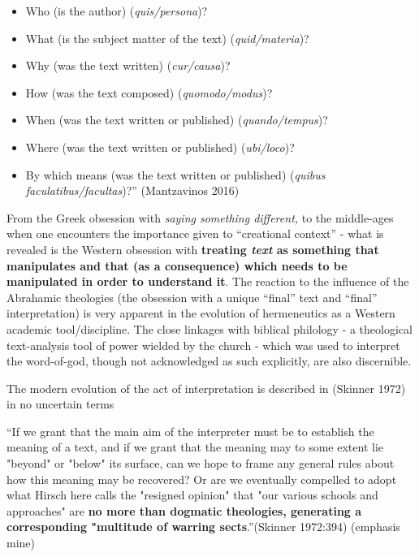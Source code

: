 \begin{itemize}
\itemsep=0pt
\item Who (is the author) (\textit{quis/persona})?

 \item What (is the subject matter of the text) (\textit{quid/materia})?

 \item Why (was the text written) (\textit{cur/causa})?

 \item How (was the text composed) (\textit{quomodo/modus})?

 \item When (was the text written or published) (\textit{quando/tempus})?

 \item Where (was the text written or published) (\textit{ubi/loco})?

 \item By which means (was the text written or published) (\textit{quibus faculatibus/facultas})?” (Mantzavinos 2016)

\end{itemize}

From the Greek obsession with \textit{saying something different,} to the middle-ages when one encounters the importance given to “creational context” - what is revealed is the Western obsession with \textbf{treating \textit{text} as something that manipulates and that (as a consequence) which needs to be manipulated in order to understand it}. The reaction to the influence of the Abrahamic theologies (the obsession with a unique “final” text and “final” interpretation) is very apparent in the evolution of hermeneutics as a Western academic tool/discipline. The close linkages with biblical philology - a theological text-analysis tool of power wielded by the church - which was used to interpret the word-of-god, though not acknowledged as such explicitly, are also discernible.

The modern evolution of the act of interpretation is described in (Skinner 1972) in no uncertain terms

\begin{myquote}
“If we grant that the main aim of the interpreter must be to establish the meaning of a text, and if we grant that the meaning may to some extent lie "beyond" or "below" its surface, can we hope to frame any general rules about how this meaning may be recovered? Or are we eventually compelled to adopt what Hirsch here calls the "resigned opinion" that "our various schools and approaches" are \textbf{no more than dogmatic theologies, generating a corresponding "multitude of warring sects}.”\hfill (Skinner 1972:394) (emphasis mine)
\end{myquote}

